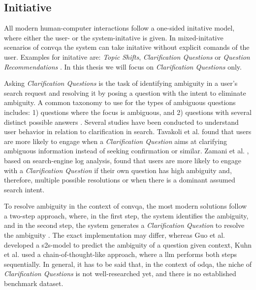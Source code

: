 \subsection{Initiative}
\label{subsec:cqa_initiative}

All modern human-computer interactions follow a one-sided initative model, where either the user- or the system-initative is given. In mixed-initative scenarios of \gls{convqa} the system can take initative without explicit comands of the user. Examples for initative are: \textit{Topic Shifts}, \textit{Clarification Questions} or \textit{Question Recommendations} \cite{zamani_conversational_2023}. In this thesis we will focus on \textit{Clarification Questions} only.

Asking \textit{Clarification Questions} is the task of identifying ambiguity in a user's search request and resolving it by posing a question with the intent to eliminate ambiguity. A common taxonomy to use for the types of ambiguous questions includes: 1) questions where the focus is ambiguous, and 2) questions with several distinct possible answers \cite{larsson_issue-based_2002}. Several studies have been conducted to understand user behavior in relation to clarification in search. Tavakoli et al. \cite{tavakoli_analyzing_2021} found that users are more likely to engage when a \textit{Clarification Question} aims at clarifying ambiguous information instead of seeking confirmation or similar. Zamani et al. \cite{zamani_analyzing_2020}, based on search-engine log analysis, found that users are more likely to engage with a \textit{Clarification Question} if their own question has high ambiguity and, therefore, multiple possible resolutions or when there is a dominant assumed search intent.

To resolve ambiguity in the context of \gls{convqa}, the most modern solutions follow a two-step approach, where, in the first step, the system identifies the ambiguity, and in the second step, the system generates a \textit{Clarification Question} to resolve the ambiguity \cite{kuhn_clam_2023, guo_abg-coqa_nodate}. The exact implementation may differ, whereas Guo et al. \cite{guo_abg-coqa_nodate} developed a \gls{s2s}-model to predict the ambiguity of a question given context, Kuhn et al. \cite{kuhn_clam_2023} used a chain-of-thought-like approach, where a \gls{llm} performs both steps sequentially. In general, it has to be said that, in the context of \gls{odqa}, the niche of \textit{Clarification Questions} is not well-researched yet, and there is no established benchmark dataset.

